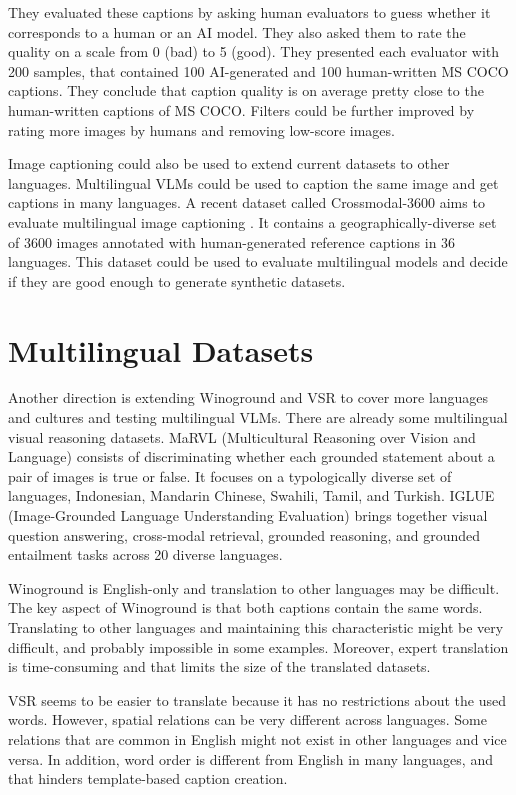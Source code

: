 They evaluated these captions by asking human evaluators to guess whether it corresponds to a human or an AI model. They also asked them to rate the quality on a scale from 0 (bad) to 5 (good). They presented each evaluator with 200 samples, that contained 100 AI-generated and 100 human-written MS COCO captions. They conclude that caption quality is on average pretty close to the human-written captions of MS COCO. Filters could be further improved by rating more images by humans and removing low-score images.

Image captioning could also be used to extend current datasets to other languages. Multilingual VLMs could be used to caption the same image and get captions in many languages. A recent dataset called Crossmodal-3600 aims to evaluate multilingual image captioning \cite{thapliyal2022crossmodal}. It contains a geographically-diverse set of 3600 images annotated with human-generated reference captions in 36 languages. This dataset could be used to evaluate multilingual models and decide if they are good enough to generate synthetic datasets.

\section{Multilingual Datasets} \label{sec:multilingual_datasets}

Another direction is extending Winoground and VSR to cover more languages and cultures and testing multilingual VLMs. There are already some multilingual visual reasoning datasets. MaRVL (Multicultural Reasoning over Vision and Language) \cite{liu-etal-2021-visually} consists of discriminating whether each grounded statement about a pair of images is true or false. It focuses on a typologically diverse set of languages, Indonesian, Mandarin Chinese, Swahili, Tamil, and Turkish. IGLUE (Image-Grounded Language Understanding Evaluation) \cite{bugliarello2022iglue} brings together visual question answering, cross-modal retrieval, grounded reasoning, and grounded entailment tasks across 20 diverse languages.

Winoground is English-only and translation to other languages may be difficult. The key aspect of Winoground is that both captions contain the same words. Translating to other languages and maintaining this characteristic might be very difficult, and probably impossible in some examples. Moreover, expert translation is time-consuming and that limits the size of the translated datasets. 

VSR seems to be easier to translate because it has no restrictions about the used words. However, spatial relations can be very different across languages. Some relations that are common in English might not exist in other languages and vice versa. In addition, word order is different from English in many languages, and that hinders template-based caption creation.

